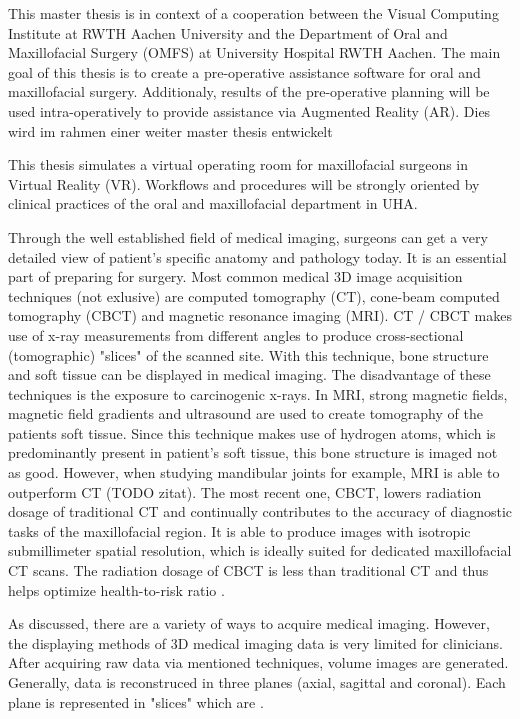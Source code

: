 This master thesis is in context of a cooperation between the Visual Computing Institute at RWTH Aachen University and the Department of Oral and Maxillofacial Surgery (OMFS) at University Hospital RWTH Aachen.
The main goal of this thesis is to create a pre-operative assistance software for oral and maxillofacial surgery.
Additionaly, results of the pre-operative planning will be used intra-operatively to provide assistance via Augmented Reality (AR). Dies wird im rahmen einer weiter master thesis entwickelt

This thesis simulates a virtual operating room for maxillofacial surgeons in Virtual Reality (VR).
Workflows and procedures will be strongly oriented by clinical practices of the oral and maxillofacial department in UHA.

Through the well established field of medical imaging, surgeons can get a very detailed view of patient’s specific anatomy and pathology today. 
It is an essential part of preparing for surgery.
Most common medical 3D image acquisition techniques (not exlusive) are computed tomography (CT), cone-beam computed tomography (CBCT) and magnetic resonance imaging (MRI).
CT / CBCT makes use of x-ray measurements from different angles to produce cross-sectional (tomographic) "slices" of the scanned site.
With this technique, bone structure and soft tissue can be displayed in medical imaging.
The disadvantage of these techniques is the exposure to carcinogenic x-rays.
In MRI, strong magnetic fields, magnetic field gradients and ultrasound are used to create tomography of the patients soft tissue.
Since this technique makes use of hydrogen atoms, which is predominantly present in patient's soft tissue, this bone structure is imaged not as good.
However, when studying mandibular joints for example, MRI is able to outperform CT (TODO zitat).
The most recent one, CBCT, lowers radiation dosage of traditional CT and continually contributes to the accuracy of diagnostic tasks of the maxillofacial region.
It is able to produce images with isotropic submillimeter spatial resolution, which is ideally suited for dedicated maxillofacial CT scans. The radiation dosage of CBCT is less than traditional CT and thus helps optimize health-to-risk ratio \cite{WHITE2008689}.

As discussed, there are a variety of ways to acquire medical imaging.
However, the displaying methods of 3D medical imaging data is very limited for clinicians.
After acquiring raw data via mentioned techniques, volume images are generated. Generally, data is reconstruced in three planes (axial, sagittal and coronal).
Each plane is represented in "slices" which are .

